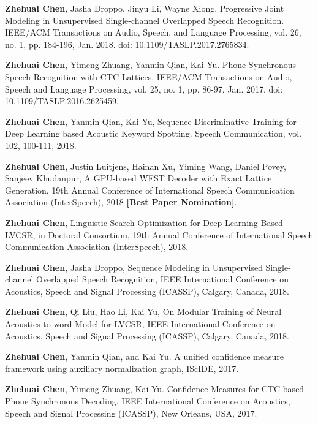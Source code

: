 
\begin{publications}{99}
 \item {\bf Zhehuai Chen}, Jasha Droppo, Jinyu Li, Wayne Xiong, Progressive Joint Modeling in Unsupervised Single-channel Overlapped Speech Recognition. IEEE/ACM Transactions on Audio, Speech, and Language Processing, vol. 26, no. 1, pp. 184-196, Jan. 2018. doi:  10.1109/TASLP.2017.2765834.
 \item {\bf Zhehuai Chen}, Yimeng Zhuang, Yanmin Qian, Kai Yu. Phone Synchronous Speech Recognition with CTC Lattices. IEEE/ACM Transactions on Audio, Speech and Language Processing, vol. 25, no. 1, pp. 86-97, Jan. 2017. doi: 10.1109/TASLP.2016.2625459.
  \item {\bf Zhehuai Chen}, Yanmin Qian, Kai Yu, Sequence Discriminative Training for Deep Learning based Acoustic Keyword Spotting. Speech Communication, vol. 102, 100-111, 2018.
 \\
    \item {\bf Zhehuai Chen}, Justin Luitjens, Hainan Xu, Yiming Wang, Daniel Povey, Sanjeev Khudanpur, A GPU-based WFST Decoder with Exact Lattice Generation,  19th Annual Conference of  International Speech Communication Association (InterSpeech), 2018 {\bf [Best Paper Nomination]}.
  \item {\bf Zhehuai Chen}, Linguistic Search Optimization for Deep Learning Based LVCSR, in Doctoral Consortium, 19th Annual Conference of  International Speech Communication Association (InterSpeech), 2018.
  \item {\bf Zhehuai Chen}, Jasha Droppo, Sequence Modeling in Unsupervised Single-channel Overlapped Speech Recognition,  IEEE International Conference on Acoustics, Speech and Signal Processing (ICASSP), Calgary, Canada, 2018.
  \item {\bf Zhehuai Chen}, Qi Liu, Hao Li, Kai Yu, On Modular Training of Neural Acoustics-to-word Model for LVCSR,  IEEE International Conference on Acoustics, Speech and Signal Processing (ICASSP), Calgary, Canada, 2018.
 \item {\bf Zhehuai Chen}, Yanmin Qian, and Kai Yu. A unified confidence measure framework using auxiliary normalization graph, IScIDE, 2017.
 \item {\bf Zhehuai Chen}, Yimeng Zhuang, Kai Yu. Confidence Measures for CTC-based Phone Synchronous Decoding. IEEE International Conference on Acoustics, Speech and Signal Processing (ICASSP), New Orleans, USA, 2017.

\end{publications}
